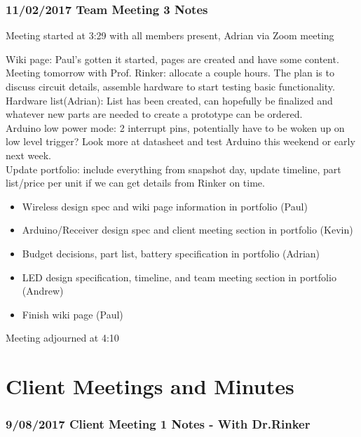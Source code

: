 \documentclass[12pt]{article}
\begin{document}
	\clearpage
	\subsubsection{11/02/2017 Team Meeting 3 Notes}
	Meeting started at 3:29 with all members present, Adrian via Zoom meeting

	\noindent
	Wiki page: Paul’s gotten it started, pages are created and have some content.\\
	
	\noindent
	Meeting tomorrow with Prof. Rinker: allocate a couple hours. The plan is to discuss circuit details, 		assemble hardware to start testing basic functionality.\\ 
	
	\noindent
	Hardware list(Adrian): List has been created, can hopefully be finalized and whatever new parts are 		needed 	to create a prototype can be ordered.\\
	
	\noindent
	Arduino low power mode: 2 interrupt pins, potentially have to be woken up on low level trigger? Look 		more at datasheet and test Arduino this weekend or early next week.\\
	
	\noindent
	Update portfolio: include everything from snapshot day, update timeline, part list/price per unit if we 	can get details from Rinker on time.\\
\begin{itemize}
\item Wireless design spec and wiki page information in portfolio (Paul)
\item Arduino/Receiver design spec and client meeting section in portfolio (Kevin)
\item  Budget decisions, part list, battery specification in portfolio (Adrian)
\item LED design specification, timeline, and team meeting section in portfolio (Andrew)
\item Finish wiki page (Paul)\\
\end{itemize}

Meeting adjourned at 4:10

\clearpage


\section{Client Meetings and Minutes}

	\subsubsection{9/08/2017 Client Meeting 1 Notes - With Dr.Rinker}
\end{document}
